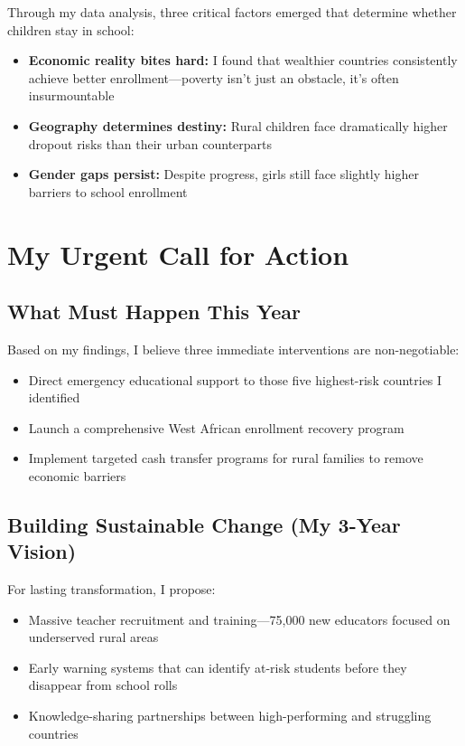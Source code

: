\documentclass[12pt,a4paper]{article}
\begin{document}
Through my data analysis, three critical factors emerged that determine whether children stay in school:

\begin{itemize}
    \item \textbf{Economic reality bites hard:} I found that wealthier countries consistently achieve better enrollment---poverty isn't just an obstacle, it's often insurmountable
    \item \textbf{Geography determines destiny:} Rural children face dramatically higher dropout risks than their urban counterparts
    \item \textbf{Gender gaps persist:} Despite progress, girls still face slightly higher barriers to school enrollment
\end{itemize}

\section{My Urgent Call for Action}

\subsection{What Must Happen This Year}

Based on my findings, I believe three immediate interventions are non-negotiable:

\begin{itemize}
    \item Direct emergency educational support to those five highest-risk countries I identified
    \item Launch a comprehensive West African enrollment recovery program
    \item Implement targeted cash transfer programs for rural families to remove economic barriers
\end{itemize}

\subsection{Building Sustainable Change (My 3-Year Vision)}

For lasting transformation, I propose:

\begin{itemize}
    \item Massive teacher recruitment and training---75,000 new educators focused on underserved rural areas
    \item Early warning systems that can identify at-risk students before they disappear from school rolls
    \item Knowledge-sharing partnerships between high-performing and struggling countries
\end{itemize}
\end{document}
